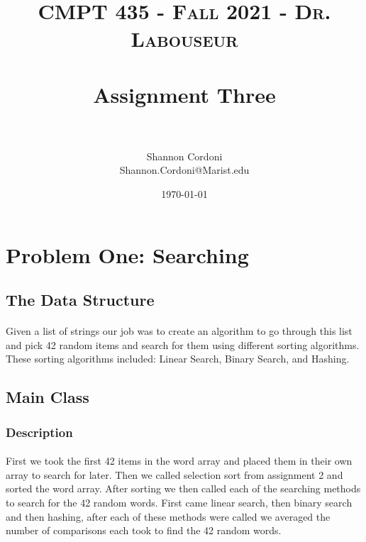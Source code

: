 \documentclass[letterpaper, 10pt,DIV=13]{scrartcl}
\title{	
   \normalfont \normalsize 
   \textsc{CMPT 435 - Fall 2021 - Dr. Labouseur} \\[10pt] %
   \horrule{0.5pt} \\[0.25cm] 	%
   \huge Assignment Three  \\     	    %
   \horrule{0.5pt} \\[0.25cm] 	%
}
\author{Shannon Cordoni \\ \normalsize Shannon.Cordoni@Marist.edu}
\date{\normalsize\today} 	%
\numberwithin{equation}{section} %
\numberwithin{figure}{section} %
\numberwithin{table}{section} %
\begin{document}
\maketitle %

\section{Problem One: Searching}

\subsection{The Data Structure}
\paragraph{} Given a list of strings our job was to create an algorithm to go through this list and pick 42 random items and search for them using different sorting algorithms. These sorting algorithms included: Linear Search, Binary Search, and Hashing. 

\subsection{Main Class}

\subsubsection{Description}
\paragraph{}First we took the first 42 items in the word array and placed them in their own array to search for later. Then we called selection sort from assignment 2 and sorted the word array. After sorting we then called each of the searching methods to search for the 42 random words. First came linear search, then binary search and then hashing, after each of these methods were called we averaged the number of comparisons each took to find the 42 random words. 
\end{document}
